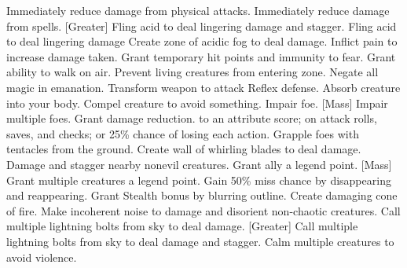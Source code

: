     {Immediately reduce damage from physical attacks.}
    {Immediately reduce damage from spells.}
[Greater]
    {Fling acid to deal lingering damage and stagger.}
    {Fling acid to deal lingering damage}
    {Create zone of acidic fog to deal damage.}
    {Inflict pain to increase damage taken.}
    {Grant temporary hit points and immunity to fear.}
    {Grant ability to walk on air.}
    {Prevent living creatures from entering zone.}
    {Negate all magic in emanation.}
    {Transform weapon to attack Reflex defense.}
    {Absorb creature into your body.}
    {Compel creature to avoid something.}
    {Impair foe.}
[Mass]
    {Impair multiple foes.}
    {Grant damage reduction.}
    { to an attribute score;  on attack rolls, saves, and checks; or 25\% chance of losing each action.}
    {Grapple foes with tentacles from the ground.}
    {Create wall of whirling blades to deal damage.}
    {Damage and stagger nearby nonevil creatures.}
    {Grant ally a legend point.}
    [Mass]
    {Grant multiple creatures a legend point.}
    {Gain 50\% miss chance by disappearing and reappearing.}
    {Grant Stealth bonus by blurring outline.}
    {Create damaging cone of fire.}
    {Make incoherent noise to damage and disorient non-chaotic creatures.}
    {Call multiple lightning bolts from sky to deal damage.}
[Greater]
    {Call multiple lightning bolts from sky to deal damage and stagger.}
    {Calm multiple creatures to avoid violence.}

